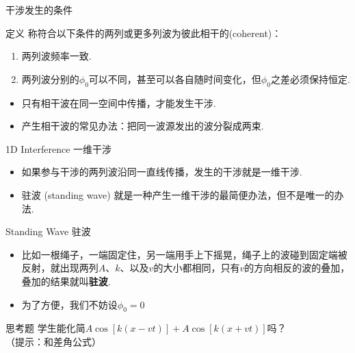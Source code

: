 \documentclass{beamer}
\newcommand{\stuname}{学生}
\begin{document}
\begin{frame}{干涉发生的条件}
	\begin{block}{定义}
		称符合以下条件的两列或更多列波为彼此相干的(coherent)：
		\begin{enumerate}
			\item 两列波频率一致.
			\item 两列波分别的$\phi_0$可以不同，甚至可以各自随时间变化，但$\phi_0$之差必须保持恒定.
		\end{enumerate}
	\end{block}		
	
	\begin{itemize}
		\item 只有相干波在同一空间中传播，才能发生干涉.
		\item 产生相干波的常见办法：把同一波源发出的波分裂成两束.
	\end{itemize}
\end{frame}

\begin{frame}{1D Interference 一维干涉}
	\begin{itemize}
		\item 如果参与干涉的两列波沿同一直线传播，发生的干涉就是一维干涉.
		\item 驻波 (standing wave) 就是一种产生一维干涉的最简便办法，但不是唯一的办法.
	\end{itemize}
\end{frame}

\begin{frame}{Standing Wave 驻波}
	\begin{itemize}
		\item 比如一根绳子，一端固定住，另一端用手上下摇晃，绳子上的波碰到固定端被反射，就出现两列$A$、$k$、以及$v$的大小都相同，只有$v$的方向相反的波的叠加，叠加的结果就叫\textbf{驻波}.
		\item 为了方便，我们不妨设$\phi_0 = 0$
	\end{itemize}
	\begin{exampleblock}{思考题}
		\stuname 能化简$A \cos \left[k\left(x-vt\right)\right] + A \cos \left[k\left(x+vt\right)\right]$吗？\\（提示：和差角公式）
	\end{exampleblock}
\end{frame}
\end{document}
